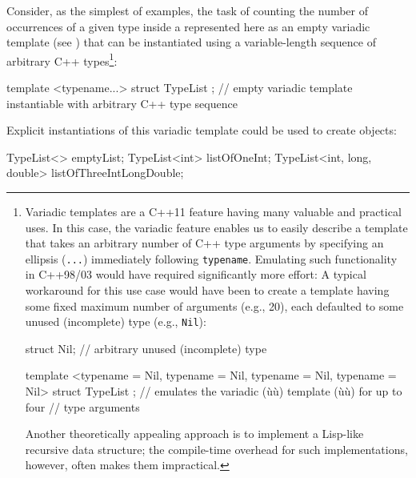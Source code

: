 Consider, as the simplest of examples, the task of counting the number
of occurrences of a given type inside a  represented
here as an empty variadic template (see ) that can be
instantiated using a variable-length sequence of arbitrary C++ types{\cprotect\footnote{Variadic templates are a C++11
  feature having many valuable and practical uses. In this case, the
  variadic feature enables us to easily describe a template that takes
  an arbitrary number of C++ type arguments by specifying an ellipsis
  (\lstinline!...!) immediately following \lstinline!typename!. Emulating such
  functionality in C++98/03 would have required significantly more
  effort: A typical workaround for this use case would have been to
  create a template having some fixed maximum number of arguments (e.g.,
  20), each defaulted to some unused (incomplete) type (e.g.,
  \lstinline!Nil!):

  \begin{emcppslisting}[style=footcode]
  struct Nil;  // arbitrary unused (incomplete) type

  template <typename = Nil, typename = Nil, typename = Nil, typename = Nil>
  struct TypeList { };
      // emulates the variadic (ù{}ù) template (ù{}ù) for up to four
      // type arguments
  \end{emcppslisting}

\vspace*{-1ex}
\noindent Another theoretically appealing approach is to implement a Lisp-like
  recursive data structure; the compile-time overhead for such
  implementations, however, often makes them impractical.}}:

\begin{emcppslisting}[emcppsbatch=e2]
template <typename...> struct TypeList { };
    // empty variadic template instantiable with arbitrary C++ type sequence
\end{emcppslisting}

\noindent Explicit instantiations of this variadic template could be used to
create objects:

\begin{emcppslisting}[emcppsbatch=e2]
TypeList<>                  emptyList;
TypeList<int>               listOfOneInt;
TypeList<int, long, double> listOfThreeIntLongDouble;
\end{emcppslisting}

